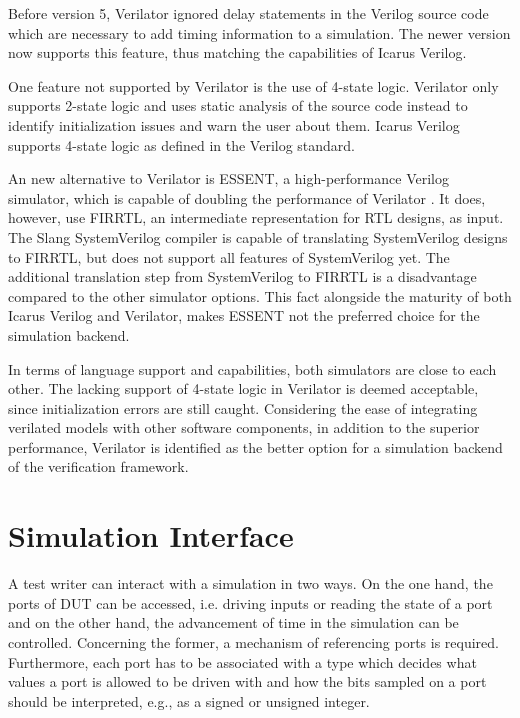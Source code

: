 Before version 5, Verilator ignored delay statements in the Verilog source code which are necessary to add timing
information to a simulation. The newer version now supports this feature, thus matching the capabilities of Icarus Verilog.

One feature not supported by Verilator is the use of 4-state logic. Verilator only supports 2-state logic and uses
static analysis of the source code instead to identify initialization issues and warn the user about them. Icarus
Verilog supports 4-state logic as defined in the Verilog standard.

An new alternative to Verilator is ESSENT, a high-performance Verilog simulator, which is capable of doubling the
performance of Verilator \cite{beamer2021essent}. It does, however, use FIRRTL, an intermediate representation for RTL
designs, as input. The Slang SystemVerilog compiler \cite{slang} is capable of translating SystemVerilog designs to
FIRRTL, but does not support all features of SystemVerilog yet. The additional translation step from SystemVerilog to
FIRRTL is a disadvantage compared to the other simulator options. This fact alongside the maturity of both Icarus
Verilog and Verilator, makes ESSENT not the preferred choice for the simulation backend.

In terms of language support and capabilities, both simulators are close to each other. The lacking support of 4-state
logic in Verilator is deemed acceptable, since initialization errors are still caught. Considering the ease of
integrating verilated models with other software components, in addition to the
superior performance, Verilator is identified as the better option for a simulation backend of the verification framework.


\section{Simulation Interface} %

A test writer can interact with a simulation in two ways. On the one hand, the ports of DUT can be accessed, i.e.
driving inputs or reading the state of a port and on the other hand, the advancement of time in the simulation can be
controlled. Concerning the former, a mechanism of referencing ports is required. Furthermore, each port has to be
associated with a type which decides what values a port is allowed to be driven with and how the bits sampled on a
port should be interpreted, e.g., as a signed or unsigned integer.

